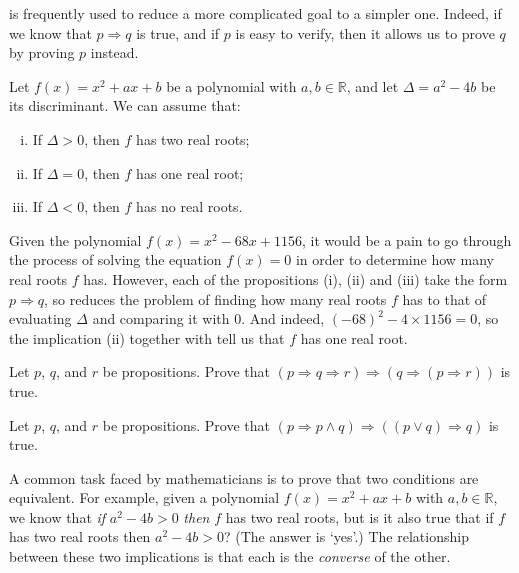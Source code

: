  is frequently used to reduce a more complicated goal to a simpler one. Indeed, if we know that $p \Rightarrow q$ is true, and if $p$ is easy to verify, then it allows us to prove $q$ by proving $p$ instead.

\begin{example}
Let $f(x) = x^2+ax+b$ be a polynomial with $a,b \in \mathbb{R}$, and let $\Delta = a^2-4b$ be its discriminant. We can assume that:
\begin{enumerate}[(i)]
\item If $\Delta > 0$, then $f$ has two real roots;
\item If $\Delta = 0$, then $f$ has one real root;
\item If $\Delta < 0$, then $f$ has no real roots.
\end{enumerate}
Given the polynomial $f(x) = x^2-68x+1156$, it would be a pain to go through the process of solving the equation $f(x)=0$ in order to determine how many real roots $f$ has. However, each of the propositions (i), (ii) and (iii) take the form $p \Rightarrow q$, so  reduces the problem of finding how many real roots $f$ has to that of evaluating $\Delta$ and comparing it with $0$. And indeed, $(-68)^2 - 4 \times 1156 = 0$, so the implication (ii) together with \elimrule{\Rightarrow} tell us that $f$ has one real root.
\end{example}

\begin{exercise}
Let $p$, $q$, and $r$ be propositions. Prove that $(p \Rightarrow q \Rightarrow r) \Rightarrow (q \Rightarrow (p \Rightarrow r))$ is true.
\end{exercise}

\begin{exercise}
Let $p$, $q$, and $r$ be propositions. Prove that $(p \Rightarrow p \wedge q) \Rightarrow ((p \vee q) \Rightarrow q)$ is true.
\end{exercise}


A common task faced by mathematicians is to prove that two conditions are equivalent. For example, given a polynomial $f(x) = x^2+ax+b$ with $a,b \in \mathbb{R}$, we know that \textit{if} $a^2-4b>0$ \textit{then} $f$ has two real roots, but is it also true that if $f$ has two real roots then $a^2-4b>0$? (The answer is `yes'.) The relationship between these two implications is that each is the \textit{converse} of the other.

